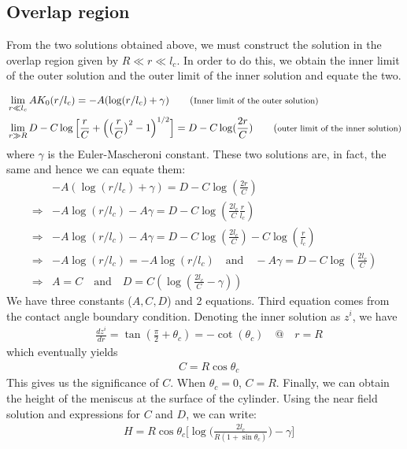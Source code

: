 \documentclass[11pt,a4paper]{article}
\newcommand{\1}{\vect{1}}
\newcommand{\RR}{\Rightarrow}
\begin{document}
\subsection*{Overlap region}

From the two solutions obtained above, we must construct the solution in the overlap region given by $R \ll r \ll l_c$. In order to do this, we obtain the inner limit of the outer solution and the outer limit of the inner solution and equate the two. 

\begin{align*}
&\lim_{r \ll l_c} A K_0(r/l_c) = -A (\log(r/l_c) + \gamma) \tag{\footnotesize{Inner limit of the outer solution}}\\
&\lim_{r \gg R}  D - C \log\Big[ \frac{r}{C}+\Big(\big(\frac{r}{C}\big)^2-1\Big)^{1/2}\Big]  = D - C \log(\frac{2r}{C}) \tag{\footnotesize{outer limit of the inner solution}}
\end{align*}
where $\gamma$ is the Euler-Mascheroni constant. These two solutions are, in fact, the same and hence we can equate them:
\begin{align*}
&-A (\log(r/l_c)+\gamma) = D - C \log(\frac{2r}{C})\\
\RR&-A\log(r/l_c) - A\gamma = D - C \log(\frac{2l_c}{C}\frac{r}{l_c})\\
\RR&-A\log(r/l_c) - A\gamma = D - C \log(\frac{2l_c}{C}) - C\log(\frac{r}{l_c})\\
\RR& -A\log(r/l_c) = -A\log(r/l_c) \quad \text{and} \quad - A\gamma = D - C \log(\frac{2l_c}{C})\\
\RR& A = C \quad \text{and} \quad D = C (\log(\frac{2l_c}{C} - \gamma))
\end{align*}
We have three constants ($A,C,D$) and 2 equations. Third equation comes from the contact angle boundary condition. Denoting the inner solution as $z^i$, we have
\begin{align*}
&\frac{dz^i}{dr} = \tan(\frac{\pi}{2} + \theta_c) = -\cot(\theta_c) \quad @ \quad r=R
\end{align*}
which eventually yields
\begin{align*}
&C = R\cos\theta_c
\end{align*}
This gives us the significance of $C$. When $\theta_c=0$, $C=R$. Finally, we can obtain the height of the meniscus at the surface of the cylinder. Using the near field solution and expressions for $C$ and $D$, we can write:
\begin{align*}
&H = R\cos\theta_c\Bigg[\log\bigg(\frac{2l_c}{R(1+\sin\theta_c)} \bigg)- \gamma \Bigg]
\end{align*}
\end{document}

